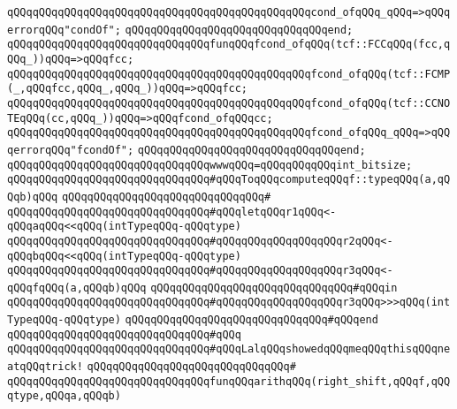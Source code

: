 \verb|qQQqqQQqqQQqqQQqqQQqqQQqqQQqqQQqqQQqqQQqqQQqqQQqcond_ofqQQq_qQQq=>qQQqerrorqQQq"condOf";|\newline
\verb|qQQqqQQqqQQqqQQqqQQqqQQqqQQqqQQqend;|\newline
\newline
\verb|qQQqqQQqqQQqqQQqqQQqqQQqqQQqqQQqfunqQQqfcond_ofqQQq(tcf::FCCqQQq(fcc,qQQq_))qQQq=>qQQqfcc;|\newline
\verb|qQQqqQQqqQQqqQQqqQQqqQQqqQQqqQQqqQQqqQQqqQQqqQQqfcond_ofqQQq(tcf::FCMP(_,qQQqfcc,qQQq_,qQQq_))qQQq=>qQQqfcc;|\newline
\verb|qQQqqQQqqQQqqQQqqQQqqQQqqQQqqQQqqQQqqQQqqQQqqQQqfcond_ofqQQq(tcf::CCNOTEqQQq(cc,qQQq_))qQQq=>qQQqfcond_ofqQQqcc;|\newline
\verb|qQQqqQQqqQQqqQQqqQQqqQQqqQQqqQQqqQQqqQQqqQQqqQQqfcond_ofqQQq_qQQq=>qQQqerrorqQQq"fcondOf";|\newline
\verb|qQQqqQQqqQQqqQQqqQQqqQQqqQQqqQQqend;|\newline
\newline
\verb|qQQqqQQqqQQqqQQqqQQqqQQqqQQqqQQqwwwqQQq=qQQqqQQqqQQqint_bitsize;|\newline
\newline
\verb|qQQqqQQqqQQqqQQqqQQqqQQqqQQqqQQq#qQQqToqQQqcomputeqQQqf::typeqQQq(a,qQQqb)qQQq|\newline
\verb|qQQqqQQqqQQqqQQqqQQqqQQqqQQqqQQq#|\newline
\verb|qQQqqQQqqQQqqQQqqQQqqQQqqQQqqQQq#qQQqletqQQqr1qQQq<-qQQqaqQQq<<qQQq(intTypeqQQq-qQQqtype)|\newline
\verb|qQQqqQQqqQQqqQQqqQQqqQQqqQQqqQQq#qQQqqQQqqQQqqQQqqQQqr2qQQq<-qQQqbqQQq<<qQQq(intTypeqQQq-qQQqtype)|\newline
\verb|qQQqqQQqqQQqqQQqqQQqqQQqqQQqqQQq#qQQqqQQqqQQqqQQqqQQqr3qQQq<-qQQqfqQQq(a,qQQqb)qQQq|\newline
\verb|qQQqqQQqqQQqqQQqqQQqqQQqqQQqqQQq#qQQqin|\newline
\verb|qQQqqQQqqQQqqQQqqQQqqQQqqQQqqQQq#qQQqqQQqqQQqqQQqqQQqr3qQQq>>>qQQq(intTypeqQQq-qQQqtype)|\newline
\verb|qQQqqQQqqQQqqQQqqQQqqQQqqQQqqQQq#qQQqend|\newline
\verb|qQQqqQQqqQQqqQQqqQQqqQQqqQQqqQQq#qQQq|\newline
\verb|qQQqqQQqqQQqqQQqqQQqqQQqqQQqqQQq#qQQqLalqQQqshowedqQQqmeqQQqthisqQQqneatqQQqtrick!|\newline
\verb|qQQqqQQqqQQqqQQqqQQqqQQqqQQqqQQq#|\newline
\verb|qQQqqQQqqQQqqQQqqQQqqQQqqQQqqQQqfunqQQqarithqQQq(right_shift,qQQqf,qQQqtype,qQQqa,qQQqb)|\newline
